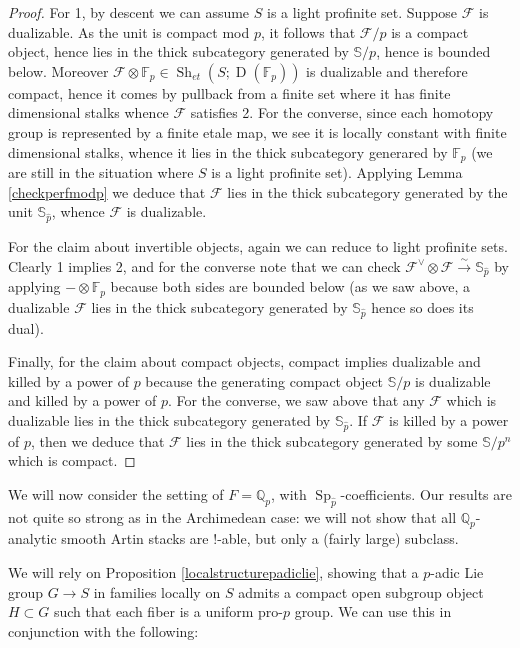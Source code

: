 \documentclass[12pt]{article}
\newcommand{\on}{\operatorname}
\newcommand{\mc}{\mathcal}
\newcommand{\mbb}{\mathbb}
\newcommand{\wh}{\widehat}
\begin{document}
\begin{proof}
For 1, by descent we can assume $S$ is a light profinite set.  Suppose $\mc{F}$ is dualizable.  As the unit is compact mod $p$, it follows that $\mc{F}/p$ is a compact object, hence lies in the thick subcategory generated by $\mbb{S}/p$, hence is bounded below.  Moreover $\mc{F}\otimes \mbb{F}_p \in \on{Sh}_{et}(S;\on{D}(\mbb{F}_p))$ is dualizable and therefore compact, hence it comes by pullback from a finite set where it has finite dimensional stalks whence $\mc{F}$ satisfies 2.  For the converse, since each homotopy group is represented by a finite etale map, we see it is locally constant with finite dimensional stalks, whence it lies in the thick subcategory generared by $\mbb{F}_p$ (we are still in the situation where $S$ is a light profinite set).  Applying Lemma \ref{checkperfmodp} we deduce that $\mc{F}$ lies in the thick subcategory generated by the unit $\mbb{S}_{\wh{p}}$, whence $\mc{F}$ is dualizable.

For the claim about invertible objects, again we can reduce to light profinite sets.  Clearly 1 implies 2, and for the converse note that we can check $\mc{F}^\vee\otimes \mc{F}\overset{\sim}{\rightarrow}\mbb{S}_{\wh{p}}$ by applying $-\otimes \mbb{F}_p$ because both sides are bounded below (as we saw above, a dualizable $\mc{F}$ lies in the thick subcategory generated by $\mbb{S}_{\wh{p}}$ hence so does its dual).

Finally, for the claim about compact objects, compact implies dualizable and killed by a power of $p$ because the generating compact object $\mbb{S}/p$ is dualizable and killed by a power of $p$.  For the converse, we saw above that any $\mc{F}$ which is dualizable lies in the thick subcategory generated by $\mbb{S}_{\wh{p}}$.  If $\mc{F}$ is killed by a power of $p$, then we deduce that $\mc{F}$ lies in the thick subcategory generated by some $\mbb{S}/p^n$ which is compact.
\end{proof}

We will now consider the setting of $F=\mbb{Q}_p$, with $\on{Sp}_{\wh{p}}$-coefficients.  Our results are not quite so strong as in the Archimedean case: we will not show that all $\mbb{Q}_p$-analytic smooth Artin stacks are $!$-able, but only a (fairly large) subclass.

We will rely on Proposition \ref{localstructurepadiclie}, showing that a $p$-adic Lie group $G\to S$ in families locally on $S$ admits a compact open subgroup object $H\subset G$ such that each fiber is a uniform pro-$p$ group.  We can use this in conjunction with the following:
\end{document}
